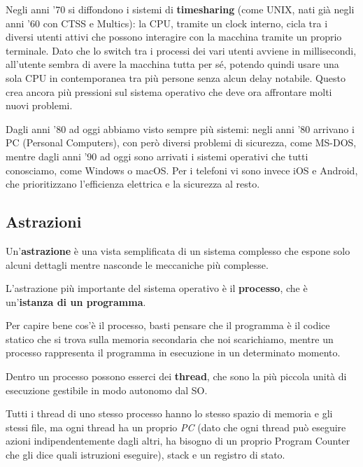 \documentclass[11pt, a4paper, titlepage, oneside]{scrbook}
\begin{document}
Negli anni '70 si diffondono i sistemi di \textbf{timesharing} (come UNIX, nati già negli anni '60 con CTSS e Multics): la CPU, tramite un clock interno, cicla tra i diversi utenti attivi che possono interagire con la macchina tramite un proprio terminale. Dato che lo switch tra i processi dei vari utenti avviene in millisecondi, all'utente sembra di avere la macchina tutta per sé, potendo quindi usare una sola CPU in contemporanea tra più persone senza alcun delay notabile. Questo crea ancora più pressioni sul sistema operativo che deve ora affrontare molti nuovi problemi.  

Dagli anni '80 ad oggi abbiamo visto sempre più sistemi: negli anni '80 arrivano i PC (Personal Computers), con però diversi problemi di sicurezza, come MS-DOS, mentre dagli anni '90 ad oggi sono arrivati i sistemi operativi che tutti conosciamo, come Windows o macOS. Per i telefoni vi sono invece iOS e Android, che prioritizzano l'efficienza elettrica e la sicurezza al resto.

\subsection{Astrazioni}

\begin{Definizione}[Astrazione]
\label{def-astrazione}
Un'\textbf{astrazione} è una vista semplificata di un sistema complesso che espone solo alcuni dettagli mentre nasconde le meccaniche più complesse.
\end{Definizione}

\begin{Definizione}[Processo]
\label{def-processo}
L'astrazione più importante del sistema operativo è il \textbf{processo}, che è un'\textbf{istanza di un programma}.
\end{Definizione}

Per capire bene cos'è il processo, basti pensare che il programma è il codice statico che si trova sulla memoria secondaria che noi scarichiamo, mentre un processo rappresenta il programma in esecuzione in un determinato momento. 

\begin{Definizione}[Thread]
\label{def-thread}
Dentro un processo possono esserci dei \textbf{thread}, che sono la più piccola unità di esecuzione gestibile in modo autonomo dal SO. 
\end{Definizione}

Tutti i thread di uno stesso processo hanno lo stesso spazio di memoria e gli stessi file, ma ogni thread ha un proprio \textit{PC} (dato che ogni thread può eseguire azioni indipendentemente dagli altri, ha bisogno di un proprio Program Counter che gli dice quali istruzioni eseguire), stack e un registro di stato.
\end{document}
